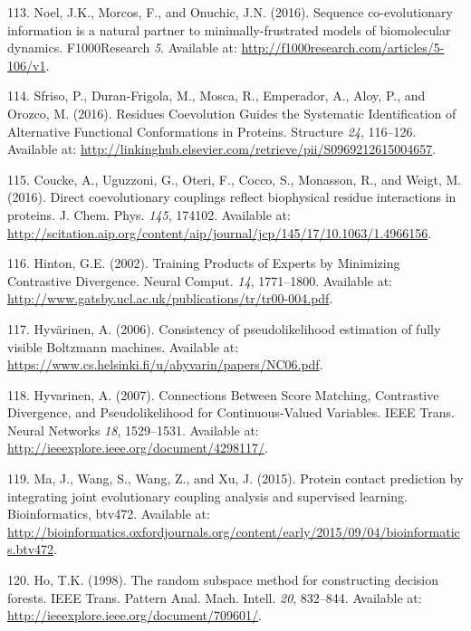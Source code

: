 \documentclass[12pt,a4paper,twoside]{book}
\theoremstyle{definition}
\theoremstyle{definition}
\theoremstyle{remark}
\begin{document}
\hypertarget{ref-Noel2016}{}
113. Noel, J.K., Morcos, F., and Onuchic, J.N. (2016). Sequence
co-evolutionary information is a natural partner to minimally-frustrated
models of biomolecular dynamics. F1000Research \emph{5}. Available at:
\url{http://f1000research.com/articles/5-106/v1}.

\hypertarget{ref-Sfriso2016}{}
114. Sfriso, P., Duran-Frigola, M., Mosca, R., Emperador, A., Aloy, P.,
and Orozco, M. (2016). Residues Coevolution Guides the Systematic
Identification of Alternative Functional Conformations in Proteins.
Structure \emph{24}, 116--126. Available at:
\url{http://linkinghub.elsevier.com/retrieve/pii/S0969212615004657}.

\hypertarget{ref-Coucke2016}{}
115. Coucke, A., Uguzzoni, G., Oteri, F., Cocco, S., Monasson, R., and
Weigt, M. (2016). Direct coevolutionary couplings reflect biophysical
residue interactions in proteins. J. Chem. Phys. \emph{145}, 174102.
Available at:
\url{http://scitation.aip.org/content/aip/journal/jcp/145/17/10.1063/1.4966156}.

\hypertarget{ref-Hinton2002}{}
116. Hinton, G.E. (2002). Training Products of Experts by Minimizing
Contrastive Divergence. Neural Comput. \emph{14}, 1771--1800. Available
at: \url{http://www.gatsby.ucl.ac.uk/publications/tr/tr00-004.pdf}.

\hypertarget{ref-Hyvarinen2006}{}
117. Hyvärinen, A. (2006). Consistency of pseudolikelihood estimation of
fully visible Boltzmann machines. Available at:
\url{https://www.cs.helsinki.fi/u/ahyvarin/papers/NC06.pdf}.

\hypertarget{ref-Hyvarinen2007}{}
118. Hyvarinen, A. (2007). Connections Between Score Matching,
Contrastive Divergence, and Pseudolikelihood for Continuous-Valued
Variables. IEEE Trans. Neural Networks \emph{18}, 1529--1531. Available
at: \url{http://ieeexplore.ieee.org/document/4298117/}.

\hypertarget{ref-Ma2015a}{}
119. Ma, J., Wang, S., Wang, Z., and Xu, J. (2015). Protein contact
prediction by integrating joint evolutionary coupling analysis and
supervised learning. Bioinformatics, btv472. Available at:
\url{http://bioinformatics.oxfordjournals.org/content/early/2015/09/04/bioinformatics.btv472}.

\hypertarget{ref-Ho1998}{}
120. Ho, T.K. (1998). The random subspace method for constructing
decision forests. IEEE Trans. Pattern Anal. Mach. Intell. \emph{20},
832--844. Available at:
\url{http://ieeexplore.ieee.org/document/709601/}.
\end{document}
